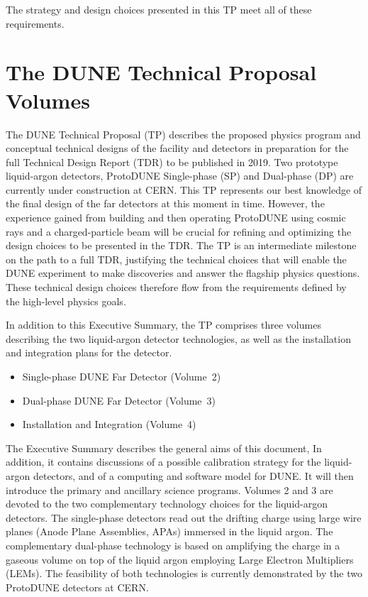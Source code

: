 The strategy and design choices presented in this TP meet all of these requirements.

\section{The DUNE Technical Proposal Volumes}


The DUNE Technical Proposal (TP) describes the proposed physics program and 
conceptual technical designs of the facility and detectors in preparation for the full Technical Design Report (TDR)
to be published in 2019. Two prototype liquid-argon detectors, ProtoDUNE Single-phase (SP) and Dual-phase (DP) are currently under construction at CERN. This TP represents our best knowledge of the final design of the far detectors at this moment
in time. However, the experience gained from building and then operating ProtoDUNE using cosmic rays and a charged-particle beam will be crucial for refining and optimizing the design choices to be presented in the TDR. The TP is an intermediate
milestone on the path to a full TDR, justifying the technical choices that will enable the DUNE experiment
to make discoveries and answer the flagship physics questions. These technical design choices therefore flow from
the requirements defined by the high-level physics goals.

In addition to this Executive Summary, the TP comprises three volumes describing the two liquid-argon detector 
technologies, as well as the installation and integration plans for the detector.
\begin{itemize}
 \item Single-phase DUNE Far Detector (Volume~2)
 \item Dual-phase DUNE Far Detector (Volume~3)
 \item Installation and Integration (Volume~4)
\end{itemize}
The Executive Summary describes the general aims of this document, In addition, it contains discussions of a possible calibration strategy for the liquid-argon detectors, and of a computing and software model for DUNE. It will then introduce
the primary and ancillary science programs. Volumes 2 and 3 are devoted to the two complementary technology choices for the
liquid-argon detectors. The single-phase detectors read out the drifting charge using large wire planes (Anode Plane Assemblies, APAs) immersed in the liquid argon. The complementary dual-phase technology is based on amplifying 
the charge in a gaseous volume
on top of the liquid argon employing Large Electron Multipliers (LEMs). 
The feasibility of both technologies is currently demonstrated by the two ProtoDUNE detectors at CERN.

